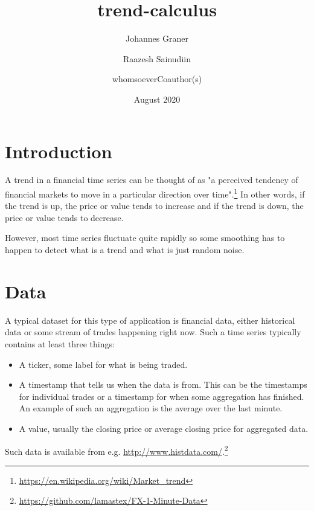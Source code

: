 \documentclass[a4paper, 12pt]{article}
\title{trend-calculus}
\author{Johannes Graner \and Raazesh Sainudiin \and whomsoeverCoauthor(s)}
\date{August 2020}
\begin{document}
\maketitle

\section{Introduction}

A trend in a financial time series can be thought of as "a perceived tendency of financial markets to move in a particular direction over time".\footnote{\url{https://en.wikipedia.org/wiki/Market_trend}}
In other words, if the trend is up, the price or value tends to increase and if the trend is down, the price or value tends to decrease. 

However, most time series fluctuate quite rapidly so some smoothing has to happen to detect what is a trend and what is just random noise.



\section{Data}

A typical dataset for this type of application is financial data, either historical data or some stream of trades happening right now. Such a time series typically contains at least three things: 

\begin{itemize}
    \item A ticker, some label for what is being traded.
    \item A timestamp that tells us when the data is from. This can be the timestamps for individual trades or a timestamp for when some aggregation has finished. An example of such an aggregation is the average over the last minute.
    \item A value, usually the closing price or average closing price for aggregated data.
\end{itemize}

Such data is available from e.g. \url{http://www.histdata.com/}.\footnote{\url{https://github.com/lamastex/FX-1-Minute-Data}}

\end{document}
